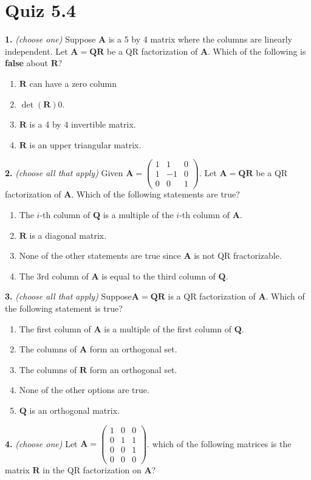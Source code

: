 \documentclass[10pt,a4paper]{article}
\begin{document}
\section{Quiz 5.4}
\textbf{1.} \textit{(choose one)} Suppose \(\mathbf{A}\) is a 5 by 4 matrix where the columns are linearly independent. Let \(\mathbf{A=QR}\) be a QR factorization of \(\mathbf{A}\). Which of the following is \textbf{false} about \(\mathbf{R}\)?

\begin{enumerate}[label=(\Alph*)]
\item \(\mathbf{R}\) can have a zero column
\item \(\det(\mathbf{R}) 0\).
\item \(\mathbf{R}\) is a 4 by 4 invertible matrix.
\item \(\mathbf{R}\) is an upper triangular matrix.
\end{enumerate}
\smallskip
\textbf{2.} \textit{(choose all that apply)} Given \(\mathbf{A}=\begin{pmatrix}1&1&0\\1&-1&0\\0&0&1\end{pmatrix}\). Let \(\mathbf{A=QR}\) be a QR factorization of \(\mathbf{A}\). Which of the following statements are true?

\begin{enumerate}[label=(\Alph*)]
\item The \(i\)-th column of \(\mathbf{Q}\) is a multiple of the \(i\)-th column of \(\mathbf{A}\).
\item \(\mathbf{R}\) is a diagonal matrix.
\item None of the other statements are true since \(\mathbf{A}\) is not QR fractorizable.
\item The 3rd column of \(\mathbf{A}\) is equal to the third column of \(\mathbf{Q}\).
\end{enumerate}
\smallskip
\textbf{3.} \textit{(choose all that apply)} Suppose\(\mathbf{A=QR}\) is a QR factorization of \(\mathbf{A}\). Which of the following statement is true?

\begin{enumerate}[label=(\Alph*)]
\item The first column of \(\mathbf{A}\) is a multiple of the first column of \(\mathbf{Q}\).
\item The columns of \(\mathbf{A}\) form an orthogonal set.
\item The columns of \(\mathbf{R}\) form an orthogonal set.
\item None of the other options are true.
\item \(\mathbf{Q}\) is an orthogonal matrix.
\end{enumerate}
\smallskip
\textbf{4.} \textit{(choose one)} Let \(\mathbf{A}=\begin{pmatrix}1&0&0\\0&1&1\\0&0&1\\0&0&0\end{pmatrix}\). which of the following matrices is the matrix \(\mathbf{R}\) in the QR factorization on \(\mathbf{A}\)?
\end{document}
